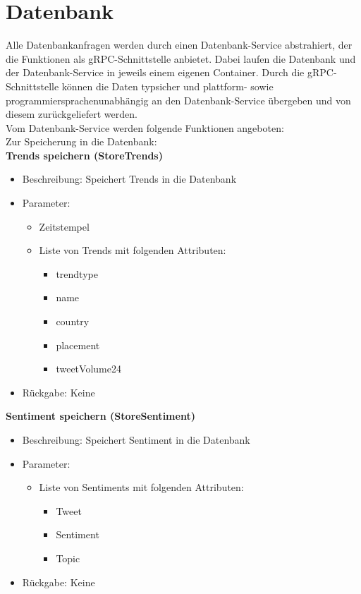 \documentclass[conference]{IEEEtran}
\begin{document}
\section{Datenbank}
Alle Datenbankanfragen werden durch einen Datenbank-Service abstrahiert, der die Funktionen als gRPC-Schnittstelle anbietet.
Dabei laufen die Datenbank und der Datenbank-Service in jeweils einem eigenen Container.
Durch die gRPC-Schnittstelle können die Daten typsicher und plattform- sowie programmiersprachenunabhängig an den Datenbank-Service übergeben und von diesem zurückgeliefert werden.
\\
Vom Datenbank-Service werden folgende Funktionen angeboten:
\\
Zur Speicherung in die Datenbank:
\\
\smallskip
\textbf{Trends speichern (StoreTrends)}
\begin{itemize}
    \item Beschreibung: Speichert Trends in die Datenbank
    \item Parameter:
          \begin{itemize}
              \item Zeitstempel
              \item Liste von Trends mit folgenden Attributen:
                    \begin{itemize}
                        \item trendtype
                        \item name
                        \item country
                        \item placement
                        \item tweetVolume24
                    \end{itemize}
          \end{itemize}
    \item Rückgabe: Keine
\end{itemize}

\smallskip
\textbf{Sentiment speichern (StoreSentiment)}
\begin{itemize}
    \item Beschreibung: Speichert Sentiment in die Datenbank
    \item Parameter:
          \begin{itemize}
              \item Liste von Sentiments mit folgenden Attributen:
                    \begin{itemize}
                        \item Tweet
                        \item Sentiment
                        \item Topic
                    \end{itemize}
          \end{itemize}
    \item Rückgabe: Keine
\end{itemize}
\end{document}
